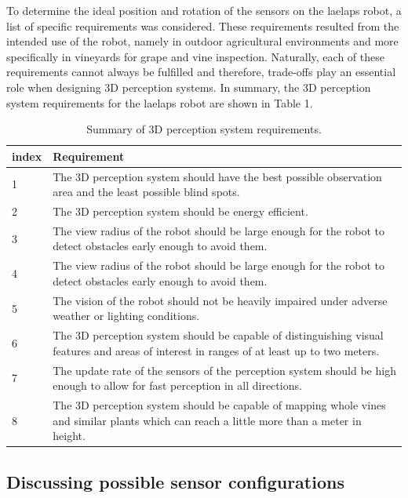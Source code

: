 \documentclass{article}
\begin{document}
To determine the ideal position and rotation of the sensors on the laelaps robot, a list of specific requirements was considered. These requirements resulted from the intended use of the robot, namely  in outdoor agricultural environments and more specifically in vineyards for grape and vine inspection. Naturally, each of these requirements cannot always be fulfilled and therefore, trade-offs play an essential role when designing 3D perception systems. In summary, the 3D perception system requirements for the laelaps robot are shown in Table 1. 

\begin{table}[htbp]
\centering
\begin{tabular}{ | m{1cm} | m{10cm}| } 
  \hline
  \textbf{index} & \textbf{Requirement} \\ 
  \hline
  1 & The 3D perception system should have the best possible observation area and the least possible blind spots. \\ 
  \hline
  2 & The 3D perception system should be energy efficient. \\ 
  \hline
  3 & The view radius of the robot should be large enough for the robot to detect obstacles early enough to avoid them. \\ 
  \hline
  4 & The view radius of the robot should be large enough for the robot to detect obstacles early enough to avoid them. \\ 
  \hline
  5 & The vision of the robot should not be heavily impaired under adverse weather or lighting conditions. \\ 
  \hline
  6 & The 3D perception system should be capable of distinguishing visual features and areas of interest in ranges of at least up to two meters.  \\ 
  \hline
  7 & The update rate of the sensors of the perception system should be high enough to allow for fast perception in all directions. \\ 
  \hline
  8 & The 3D perception system should be capable of mapping whole vines and similar plants which can reach a little more than a meter in height. \\ 
  \hline
\end{tabular}
\caption{Summary of 3D perception system requirements.}
\end{table}


\subsection{Discussing possible sensor configurations}
\end{document}
